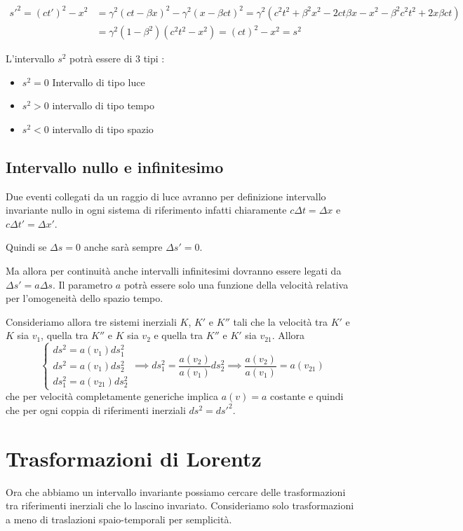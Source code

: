 \documentclass[12pt,a4paper,titlepage, twoside, openright]{book}
\numberwithin{equation}{chapter}
\begin{document}
\begin{align*}
s'^2=(ct')^2-x^2 &=\gamma^2(ct-\beta x)^2-\gamma^2(x-\beta ct)^2=\gamma^2 (c^2t^2+\beta^2 x^2 -2ct\beta x -x^2 - \beta^2c^2t^2 +2x\beta ct)\\
&= \gamma^2 (1-\beta^2)(c^2t^2-x^2)=(ct)^2-x^2 = s^2
\end{align*}

L'intervallo $s^2$ potrà essere di 3 tipi :
\begin{itemize}
\item $s^2=0$ Intervallo di tipo luce
\item $s^2>0$ intervallo di tipo tempo
\item $s^2<0$ intervallo di tipo spazio
\end{itemize}

\subsection{Intervallo nullo e infinitesimo}

Due eventi collegati da un raggio di luce avranno per definizione intervallo invariante nullo in ogni sistema di riferimento infatti chiaramente $c\Delta t=\Delta x$ e $c\Delta t'=\Delta x'$.

Quindi se $\Delta s=0$ anche sarà sempre $\Delta s'=0$.

Ma allora per continuità anche intervalli infinitesimi dovranno essere legati da $\Delta s'= a \Delta s$. Il parametro $a$ potrà essere solo una funzione della velocità relativa per l'omogeneità dello spazio tempo.

Consideriamo allora tre sistemi inerziali $K$, $K'$ e $K''$ tali che la velocità tra $K'$ e $K$ sia $v_1$, quella tra $K''$ e $K$ sia $v_2$ e quella tra $K''$ e $K'$ sia $v_{21}$. Allora
\[\begin{cases}
ds^2=a(v_1)ds_1^2 \\
ds^2=a(v_1)ds_2^2 \\
ds_1^2=a(v_{21})ds_2^2
\end{cases} \implies
ds_1^2=\dfrac{a(v_2)}{a(v_1)}ds_2^2 \implies
\dfrac{a(v_2)}{a(v_1)}=a(v_{21}) 
\]
che per velocità completamente generiche implica $a(v)=a$ costante e quindi che per ogni coppia di riferimenti inerziali $ds^2=ds'^2$.
\section{Trasformazioni di Lorentz}\label{sezTrasformazioniLorentz}

Ora che abbiamo un intervallo invariante possiamo cercare delle trasformazioni tra riferimenti inerziali che lo lascino invariato. Consideriamo solo trasformazioni a meno di traslazioni spaio-temporali per semplicità.
\end{document}

